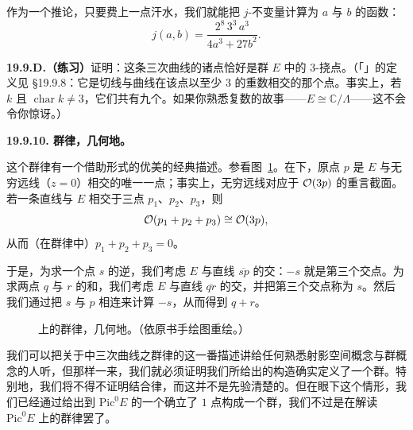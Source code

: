 作为一个推论，只要费上一点汗水，我们就能把 $j$-不变量计算为 $a$ 与 $b$ 的函数：
\[
j(a,b)=\frac{2^8\,3^3\,a^3}{4a^3+27b^2}.
\]

\textbf{19.9.D.（练习）}\quad 证明：这条三次曲线的诸\trFlex{}点恰好是群 $E$ 中的 $3$-挠点。（「\trFlex」的定义见 \S19.9.8：它是切线与曲线在该点以至少 $3$ 的重数相交的那个点。事实上，若 $k$ \trAlgClosed{}且 $\operatorname{char}k\ne 3$，它们共有九个。如果你熟悉复数的故事——$E\cong\mathbb{C}/\Lambda$——这不会令你惊讶。）

\textbf{19.9.10. 群律，几何地。}

这个群律有一个借助形式的优美的经典描述。参看图~\ref{fig:group-law-geometric}。在\trCoordinate{}下，原点 $p$ 是 $E$ 与无穷远线（$z=0$）相交的唯一一点；事实上，无穷远线对应于 $\mathcal{O}(3p)$ 的重言截面。若一条直线与 $E$ 相交于三点 $p_1$、$p_2$、$p_3$，则
\[
\mathcal{O}(p_1+p_2+p_3)\cong\mathcal{O}(3p),
\]
从而（在群律中）$p_1+p_2+p_3=0$。

于是，为求一个点 $s$ 的逆，我们考虑 $E$ 与直线 $\overline{sp}$ 的交：$-s$ 就是第三个交点。为求两点 $q$ 与 $r$ 的和，我们考虑 $E$ 与直线 $\overline{qr}$ 的交，并把第三个交点称为 $s$。然后我们通过把 $s$ 与 $p$ 相连来计算 $-s$，从而得到 $q+r$。

\begin{figure}[htbp]
\centering
{}
\caption{\trEllipticCurve{}上的群律，几何地。（依原书手绘图重绘。）}\label{fig:group-law-geometric}
\end{figure}

我们可以把关于\trWeierstrassNormalForm{}中三次曲线之群律的这一番描述讲给任何熟悉射影空间概念与群概念的人听，但那样一来，我们就必须证明我们所给出的构造确实定义了一个群。特别地，我们将不得不证明结合律，而这并不是先验清楚的。但在眼下这个情形，我们已经通过给出到 $\mathrm{Pic}^0E$ 的一个\trBijection{}确立了\trDegree{} $1$ 点构成一个群，我们不过是在解读 $\mathrm{Pic}^0E$ 上的群律罢了。

